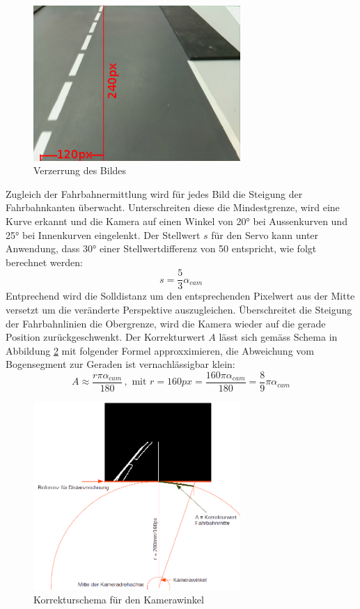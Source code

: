 \begin{figure}[H]%
\centering
\includegraphics[width=0.7\textwidth]{03_Loesungskonzept/pictures/Verzerrung.png}
\caption{Verzerrung des Bildes}
\label{fig:routeCorr}
\end{figure}
Zugleich der Fahrbahnermittlung wird für jedes Bild die Steigung der Fahrbahnkanten überwacht. Unterschreiten diese die Mindestgrenze, wird eine Kurve erkannt und die Kamera auf einen Winkel von 20° bei Aussenkurven und 25° bei Innenkurven eingelenkt. Der Stellwert $s$ für den Servo kann unter Anwendung, dass 30° einer Stellwertdifferenz von 50 entspricht, wie folgt berechnet werden: 
\[
s = \frac{5}{3}\alpha_{cam}
\]
Entprechend wird die Solldistanz um den entsprechenden Pixelwert aus der Mitte versetzt um die veränderte Perspektive auszugleichen. Überschreitet die Steigung der Fahrbahnlinien die Obergrenze, wird die Kamera wieder auf die gerade Position zurückgeschwenkt. Der Korrekturwert $A$ lässt sich gemäss Schema in Abbildung \ref{fig:corrCam} mit folgender Formel approxximieren, die Abweichung vom Bogensegment zur Geraden ist vernachlässigbar klein:
\[
A \approx \frac{r\pi\alpha_{cam}}{180} \,, \text{ mit }r=160px = \frac{160\pi\alpha_{cam}}{180} = \frac{8}{9}\pi\alpha_{cam}
\]
\begin{figure}[H]%
\centering
\includegraphics[width=0.7\textwidth]{03_Loesungskonzept/pictures/Kamerawinkelkorrektur.png}
\caption{Korrekturschema für den Kamerawinkel}
\label{fig:corrCam}
\end{figure}

